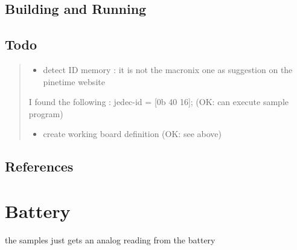 \documentclass[letterpaper,10pt,english]{sphinxmanual}
\begin{document}
\subsection{Building and Running}
\label{\detokenize{drivers/spinor:building-and-running}}
\begin{sphinxVerbatim}[commandchars=\\\{\}]
\end{sphinxVerbatim}


\subsection{Todo}
\label{\detokenize{drivers/spinor:todo}}\begin{quote}
\begin{itemize}
\item {} 
detect ID memory  : it is not the macronix one as suggestion on the pinetime website

\end{itemize}

I found the following : jedec-id = {[}0b 40 16{]}; (OK: can execute sample program)
\begin{itemize}
\item {} 
create working board definition (OK: see above)

\end{itemize}
\end{quote}


\subsection{References}
\label{\detokenize{drivers/spinor:references}}


\section{Battery}
\label{\detokenize{drivers/battery:battery}}\label{\detokenize{drivers/battery::doc}}
the samples just gets an analog reading from the battery

\begin{sphinxVerbatim}[commandchars=\\\{\}]
\end{sphinxVerbatim}
\end{document}
